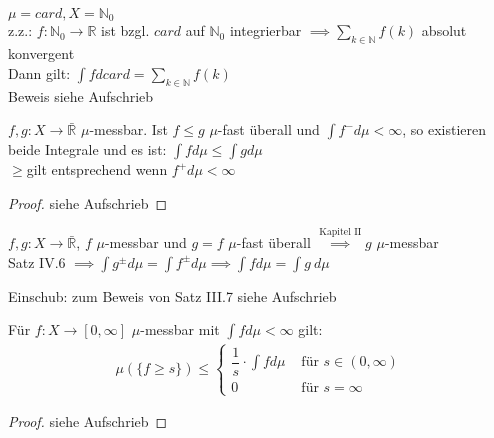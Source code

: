   \begin{example}
    $\mu = card, X = \mathbb{N}_0$\\
    z.z.: $f: \mathbb{N}_0 \to \mathbb{R}$ ist bzgl. $card$ auf $\mathbb{N}_0$ integrierbar $\implies \sum\limits_{k \in \mathbb{N}} f(k)$ absolut konvergent\\
    Dann gilt: $\int f d card = \sum\limits_{k \in \mathbb{N}} f(k)$\\
    Beweis siehe Aufschrieb
  \end{example}

  \begin{theorem}
    $f,g:X \to \bar{\mathbb{R}}$ $\mu$-messbar. Ist $f \leq g$ $\mu$-fast überall und $\int f^- d\mu < \infty$, so existieren beide Integrale und es ist: $\int f d\mu \leq \int g d\mu$\\
    \glqq$\geq$\grqq gilt entsprechend wenn $f^+ d\mu < \infty$
  \end{theorem}

  \begin{proof}
    siehe Aufschrieb
  \end{proof}

  \begin{remark}
    $f,g: X \to \bar{\mathbb{R}}$, $f$ $\mu$-messbar und $g = f$ $\mu$-fast überall $\stackrel{\text{Kapitel II}}{\implies} g$ $\mu$-messbar\\
    Satz IV.6 $\implies \int g^{\pm} d\mu = \int f^{\pm} d\mu \implies \int f d\mu = \int g \ d\mu$
  \end{remark}


  \begin{remark}
    Einschub: zum Beweis von Satz III.7
    siehe Aufschrieb
  \end{remark}

  \begin{lemma}
    Für $f:X \to [0, \infty]$ $\mu$-messbar mit $\int f d\mu < \infty$ gilt:
    \begin{align*}
      \mu(\{f\geq s\}) \leq \begin{cases}
        \dfrac{1}{s} \cdot \int f d\mu & \text{ für } s \in (0, \infty)\\
        0 & \text{ für } s = \infty
      \end{cases}
    \end{align*}
  \end{lemma}

  \begin{proof}
    siehe Aufschrieb
  \end{proof}

